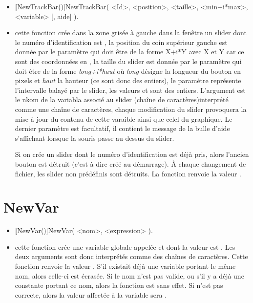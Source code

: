 \begin{itemize}
 \item \util \textbf[NewTrackBar()]{NewTrackBar( <Id>, <position>, <taille>, <min+i*max>, <variable> [, aide] )}. 
 \item \desc cette fonction crée dans la zone grisée à gauche dans la fenêtre un slider dont le numéro d'identification est  , la position du coin supérieur gauche est donnée par le paramètre  qui doit être de la forme X+i*Y avec X et Y  car ce sont des coordonnées en , la taille du slider est donnée par le paramètre  qui doit être de la forme \textit{long+i*haut} où \textit{long} désigne la longueur du bouton en pixels et \textit{haut} la hauteur (ce sont donc des entiers), le paramètre  représente l'intervalle balayé par le slider, les valeurs  et sont des entiers. L'argument  est le nkom de la variabla associé au slider (chaîne de caractères)interprété comme une chaîne de caractères, chaque modification du slider provoquera la mise à jour du contenu de cette varaible ainsi que celel du graphique. Le dernier paramètre  est facultatif, il contient le message de la bulle d'aide s'affichant lorsque la souris passe au-dessus du slider. 
 
 Si on crée un slider dont le numéro d'identification est déjà pris, alors l'ancien bouton est détruit  (c'est à dire créé au démarrage). \`A chaque changement de fichier, les slider non prédéfinis sont détruits. La fonction  renvoie la valeur \Nil.
\end{itemize}

\section{NewVar}\label{cmdNewVar}
\begin{itemize}
 \item \util \textbf[NewVar()]{NewVar( <nom>, <expression> )}.
 \item \desc cette fonction crée une variable globale appelée  et dont la valeur est . Les deux arguments sont donc interprétés comme des chaînes de caractères. Cette fonction renvoie la valeur \Nil. S'il existait déjà une variable portant le même nom, alors celle-ci est écrasée. Si le nom n'est pas valide, ou s'il y a déjà une constante portant ce nom, alors la fonction est sans effet. Si  n'est pas correcte, alors la valeur affectée à la variable sera \Nil.
\end{itemize}


